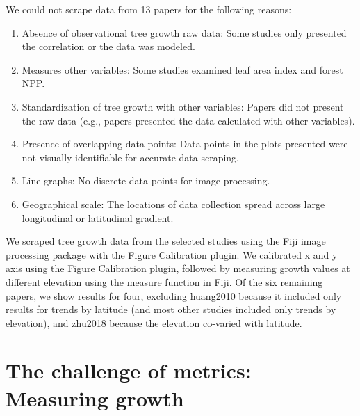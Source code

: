 \documentclass[11pt]{article}
\begin{document}
We could not scrape data from 13 papers for the following reasons: 
\begin{enumerate}
\item Absence of observational tree growth raw data: Some studies only presented the correlation or the data was modeled. 
\item  Measures other variables: Some studies examined leaf area index and forest NPP. 
\item  Standardization of tree growth with other variables: Papers did not present the raw data (e.g., papers presented the data calculated with other variables).
\item  Presence of overlapping data points: Data points in the plots presented were not visually identifiable for accurate data scraping.
\item Line graphs: No discrete data points for image processing. 
\item Geographical scale: The locations of data collection spread across large longitudinal or latitudinal gradient. 
\end{enumerate}

We scraped tree growth data from the selected studies using the Fiji image processing package with the Figure Calibration plugin. We calibrated x and y axis using the Figure Calibration plugin, followed by measuring growth values at different elevation using the measure function in Fiji. Of the six remaining papers, we show results for four, excluding huang2010 because it included only results for trends by latitude (and most other studies included only trends by elevation), and zhu2018 because the elevation co-varied with latitude. %
\section{The challenge of metrics: Measuring growth}
\end{document}
